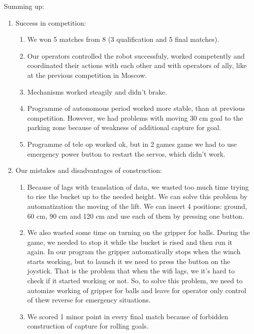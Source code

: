 Summing up:
\begin{enumerate}
	\item Success in competition:
	\begin{enumerate}
		
		\item We won 5 matches from 8 (3 qualification and 5 final matches).
		
		\item Our operators controlled the robot successfuly, worked competently and coordinated their actions with each other and with operators of ally, like at the previous competition in Moscow.
		
		\item Mechanisms worked steagily and didn't brake.
		
		\item Programme of autonomous period worked more stable, than at previous competition. However, we had problems with moving 30 cm goal to the parking zone because of weakness of additional capture for goal.
		
		\item Programme of tele op worked ok, but in 2 games game we had to use emergency power button to restart the servos, which didn't work.
		
	\end{enumerate}
	
	\item Our mistakes and disadvantages of construction:
	\begin{enumerate}
		\item Because of lags with translation of data, we wasted too much time trying to rise the bucket up to the needed height. We can solve this problem by automatization the moving of the lift. We can insert 4 positions: ground, 60 cm, 90 cm and 120 cm and use each of them by pressing one button.
		
		\item We also wasted some time on turning on the gripper for balls. During the game, we needed to stop it while the bucket is rised and then run it again. In our program the gripper automatically stops when the winch starts working, but to launch it we need to press the button on the joystick. That is the problem that when the wifi lags, we it's hard to check if it started working or not. So, to solve this problem, we need to automize working of gripper for balls and leave for operator only control of thew reverse for emergency situations.
		
		\item We scored 1 minor point in every final match because of forbidden construction of capture for rolling goals.
		

\end{enumerate}
\end{enumerate}
